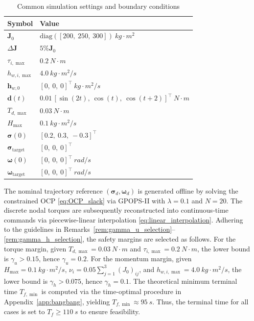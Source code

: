\documentclass[journal]{new-aiaa}
\begin{document}
\begin{table}[htbp]
\centering
\caption{Common simulation settings and boundary conditions}
\label{tab:sim_setup_all}
\begin{tabular}{@{}l l@{}}
\toprule
\textbf{Symbol} & \textbf{Value} \\
\midrule
$\boldsymbol{J}_0$ &
$\mathrm{diag}([200,\ 250,\ 300])~\si{kg\cdot m^2}$ \\
$\Delta\boldsymbol{J}$ &
$5\% \boldsymbol{J}_0 $ \\
$\tau_{i,\max}$ &
$\SI{0.2}{N\cdot m}$ \\
$h_{w,i,\max}$ &
$\SI{4.0}{kg\cdot m^2/s}$ \\
$\boldsymbol{h}_{w,0}$ &
$[0,\ 0,\ 0]^\top~\si{kg\cdot m^2/s}$ \\
$\boldsymbol{d}(t)$ &
$0.01\,[\sin(2t),\ \cos(t),\ \cos(t+2)]^\top~\si{N\cdot m}$ \\
$T_{d,\max}$ &
$\SI{0.03}{N\cdot m}$ \\
$H_{\max}$ &
$\SI{0.1}{kg\cdot m^2/s}$ \\
$\boldsymbol{\sigma}(0)$ &
$[0.2,\ 0.3,\ -0.3]^\top$ \\
$\boldsymbol{\sigma}_{\mathrm{target}}$ &
$[0,\ 0,\ 0]^\top$ \\
$\boldsymbol{\omega}(0)$ &
$[0,\ 0,\ 0]^\top~\si{rad/s}$ \\
$\boldsymbol{\omega}_{\mathrm{target}}$ &
$[0,\ 0,\ 0]^\top~\si{rad/s}$ \\\bottomrule
\end{tabular}
\end{table}

The nominal trajectory reference $(\boldsymbol{\sigma}_d,\boldsymbol{\omega}_d)$ is generated offline by solving the constrained OCP
\eqref{eq:OCP_slack} via GPOPS-II with $\lambda=0.1$ and
$N=20$. The discrete nodal torques are subsequently reconstructed into continuous-time commands via
piecewise-linear interpolation \eqref{eq:linear_interpolation}.
Adhering to the guidelines in Remarks~\ref{rem:gamma_u_selection}--\ref{rem:gamma_h_selection},
the safety margins are selected as follows.
For the torque margin, given $T_{d,\max}=\SI{0.03}{N\cdot m}$ and $\tau_{i,\max}=\SI{0.2}{N\cdot m}$, the lower bound is $\gamma_u > 0.15$, hence $\gamma_u = 0.2$.
For the momentum margin, given $H_{\max}=\SI{0.1}{kg\cdot m^2/s}$, $\nu_i = 0.05 \sum_{j=1}^{3} (J_0)_{ij}$, and $h_{w,i,\max}=\SI{4.0}{kg\cdot m^2/s}$, the lower bound is $\gamma_h > 0.075$, hence $\gamma_h = 0.1$.
The theoretical minimum terminal time $T_{f,\min}$ is computed via the time-optimal procedure in Appendix~\ref{app:bangbang}, yielding $T_{f,\min} \approx \SI{95}{s}$.
Thus, the terminal time for all cases is set to $T_f \ge \SI{110}{s}$ to ensure feasibility.
\end{document}
